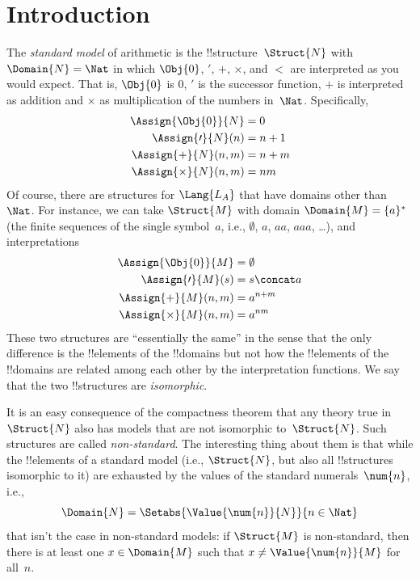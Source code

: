 \documentclass[../../../include/open-logic-section]{subfiles}
\begin{document}
\section{Introduction}

The \emph{standard model} of arithmetic is the
!!{structure}~$\Struct{N}$ with $\Domain{N} = \Nat$ in which
$\Obj{0}$, $\prime$, $+$, $\times$, and $<$ are interpreted as you
would expect. That is, $\Obj{0}$ is $0$, $\prime$ is the successor
function, $+$ is interpreted as addition and $\times$ as multiplication
of the numbers in~$\Nat$. Specifically,
\begin{align*}
  \Assign{\Obj{0}}{N} & = 0\\
  \Assign{\prime}{N}(n) & = n + 1\\
  \Assign{+}{N}(n, m) & = n + m\\
  \Assign{\times}{N}(n, m) & = nm
\end{align*}
Of course, there are structures for $\Lang{L_A}$ that have domains
other than~$\Nat$. For instance, we can take $\Struct{M}$ with domain
$\Domain{M} = \{a\}^*$ (the finite sequences of the single
symbol~$a$, i.e., $\emptyset$, $a$, $aa$, $aaa$, \dots), and
interpretations
\begin{align*}
  \Assign{\Obj{0}}{M} & = \emptyset\\
  \Assign{\prime}{M}(s) & = s \concat a\\
  \Assign{+}{M}(n, m) & = a^{n + m}\\
  \Assign{\times}{M}(n, m) & = a^{nm}
\end{align*}
These two structures are ``essentially the same'' in the sense that
the only difference is the !!{element}s of the !!{domain}s but not how
the !!{element}s of the !!{domain}s are related among each other by
the interpretation functions. We say that the two !!{structure}s are
\emph{isomorphic}.

It is an easy consequence of the compactness theorem that any theory
true in~$\Struct{N}$ also has models that are not isomorphic
to~$\Struct{N}$.  Such structures are called \emph{non-standard}.  The
interesting thing about them is that while the !!{element}s of a
standard model (i.e., $\Struct{N}$, but also all !!{structure}s
isomorphic to it) are exhausted by the values of the standard
numerals~$\num{n}$, i.e.,
\[
\Domain{N} = \Setabs{\Value{\num{n}}{N}}{n \in \Nat}
\]
that isn't the case in non-standard models: if $\Struct{M}$ is
non-standard, then there is at least one $x \in \Domain{M}$ such that
$x \neq \Value{\num{n}}{M}$ for all~$n$.
\end{document}
